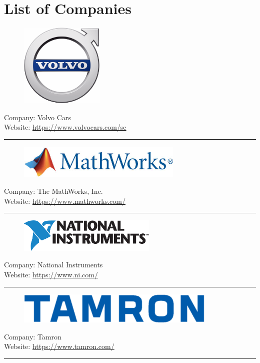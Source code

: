 \chapter{List of Companies}
\label{AppLoC}

\begin{figure}[h!]
\includegraphics[height=4cm]{Pictures/AppVolvoLogo}
\end{figure}
\vspace{3mm}
Company: Volvo Cars\\
Website: \url{https://www.volvocars.com/se}
\vspace{5mm}
\hrule
\vspace{10mm}

\begin{figure}[h!]
\includegraphics[height=1.6cm]{Pictures/AppMathworksLogo}
\end{figure}
\vspace{3mm}
Company: The MathWorks, Inc.\\
Website: \url{https://www.mathworks.com/}
\vspace{5mm}
\hrule
\vspace{10mm}

\begin{figure}[h!]
\includegraphics[height=1.6cm]{Pictures/AppNationalInstrumentLogo}
\end{figure}
\vspace{3mm}
Company: National Instruments\\ 
Website: \url{https://www.ni.com/}
\vspace{5mm}
\hrule
\vspace{10mm}

\newpage
\begin{figure}[h!]
\includegraphics[height=1.5cm]{Pictures/AppTamronLogo}
\end{figure}
\vspace{3mm}
Company: Tamron\\
Website: \url{https://www.tamron.com/}
\vspace{5mm}
\hrule
\vspace{10mm}

